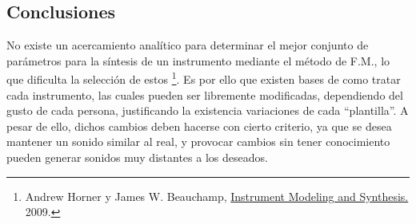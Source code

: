 \subsection{Conclusiones}
No existe un acercamiento analítico para determinar el mejor conjunto de parámetros para la síntesis de un instrumento mediante el método de F.M., lo que dificulta la selección de estos \footnote{Andrew Horner y James W. Beauchamp, \href{https://www.researchgate.net/publication/226790075_Instrument_Modeling_and_Synthesis}{Instrument Modeling and Synthesis.} 2009.}. Es por ello que existen bases de como tratar cada instrumento, las cuales pueden ser libremente modificadas, dependiendo del gusto de cada persona, justificando la existencia variaciones de cada ``plantilla''. A pesar de ello, dichos cambios deben hacerse con cierto criterio, ya que se desea mantener un sonido similar al real, y provocar cambios sin tener conocimiento pueden generar sonidos muy distantes a los deseados.
